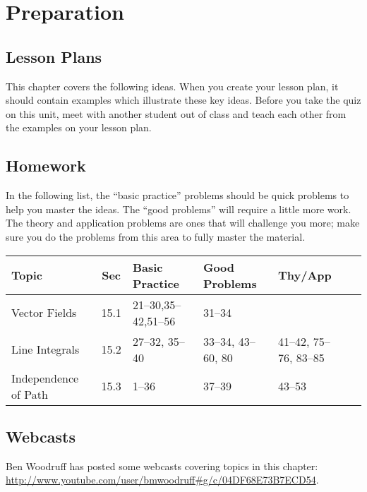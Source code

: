 \section{Preparation}

\subsection{Lesson Plans}

This chapter covers the following ideas. When you create your lesson plan, it should contain examples which illustrate these key ideas. Before you take the quiz on this unit, meet with another student out of class and teach each other from the examples on your lesson plan. 





\subsection{Homework}

In the following list, the ``basic practice'' problems should be quick
problems to help you master the ideas.  The ``good problems'' will
require a little more work.  The theory and application problems are
ones that will challenge you more; make sure you do the problems from
this area to fully master the material.  

{\noindent %
\begin{tabular}{|l|c|l|l|l|l|}\hline
Topic &Sec &Basic Practice &Good Problems &Thy/App \\\hline
Vector Fields & 15.1&21--30,35--42,51--56 & 31--34& \\\hline
Line Integrals & 15.2&27--32, 35--40 & 33--34, 43--60, 80 & 41--42, 75--76, 83--85\\\hline
Independence of Path & 15.3&1--36 & 37--39& 43--53\\\hline
\end{tabular}

}

\subsection{Webcasts}

Ben Woodruff has posted some webcasts covering topics in this chapter: \url{http://www.youtube.com/user/bmwoodruff#g/c/04DF68E73B7ECD54}.




